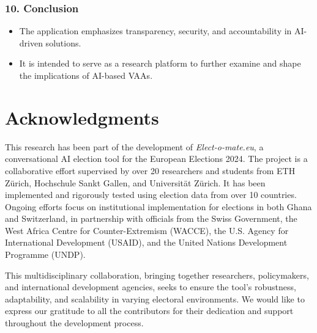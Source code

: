 \documentclass{article}
\begin{document}
\subsubsection*{10. Conclusion}
\begin{itemize}

    \item The application emphasizes transparency, security, and accountability in AI-driven solutions.
    \item It is intended to serve as a research platform to further examine and shape the implications of AI-based VAAs.
\end{itemize}














\newpage
\section*{Acknowledgments}

This research has been part of the development of \emph{Elect-o-mate.eu}, a conversational AI election tool for the European Elections 2024. The project is a collaborative effort supervised by over 20 researchers and students from ETH Zürich, Hochschule Sankt Gallen, and Universität Zürich. It has been implemented and rigorously tested using election data from over 10 countries. Ongoing efforts focus on institutional implementation for elections in both Ghana and Switzerland, in partnership with officials from the Swiss Government, the West Africa Centre for Counter-Extremism (WACCE), the U.S. Agency for International Development (USAID), and the United Nations Development Programme (UNDP).

This multidisciplinary collaboration, bringing together researchers, policymakers, and international development agencies, seeks to ensure the tool's robustness, adaptability, and scalability in varying electoral environments. We would like to express our gratitude to all the contributors for their dedication and support throughout the development process.
\end{document}
